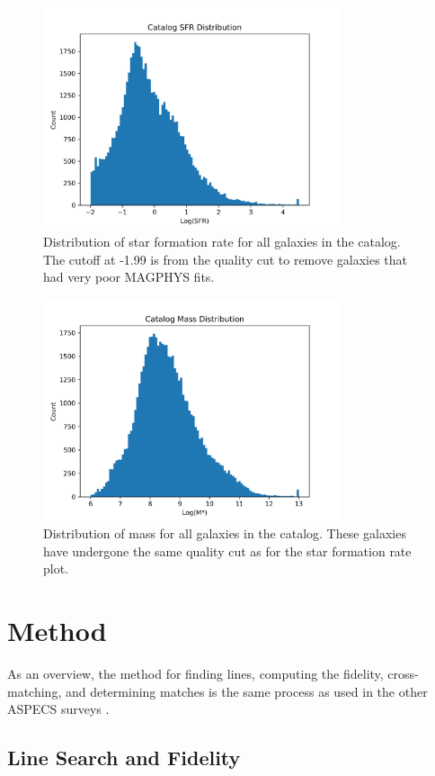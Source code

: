 \begin{figure}[!tbp]
\centering \includegraphics[width=87mm]{Survey/MAGPHYS_SFR.png}
\caption{Distribution of star formation rate for all galaxies in the catalog. The cutoff at -1.99 is from the quality cut to remove galaxies that had very poor MAGPHYS fits.}
\label{fig:MAGPHYS_Properties}
\end{figure}

\begin{figure}[!tbp]
\centering \includegraphics[width=87mm]{Survey/MAGPHYS_Mstar.png}
\caption{Distribution of mass for all galaxies in the catalog. These galaxies have undergone the same quality cut as for the star formation rate plot.}
\label{fig:MAGPHYS_Properties}
\end{figure}

\section{Method}

As an overview, the method for finding lines, computing the fidelity, cross-matching, and determining matches is the same process as used in the other ASPECS surveys \cite{walter2016alma, decarli2019alma, gonzalez2019alma}.

\subsection{Line Search and Fidelity}

